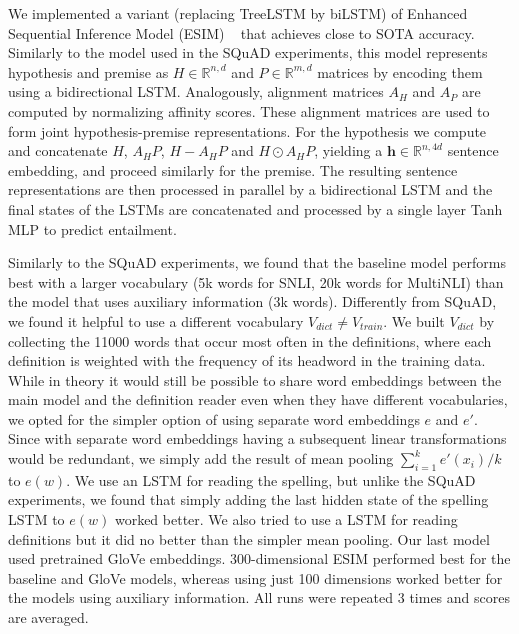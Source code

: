 We implemented a variant (replacing TreeLSTM by biLSTM) of Enhanced Sequential
Inference Model (ESIM) ~\citep{DBLP:journals/corr/ChenZLWJ16} that achieves close to SOTA accuracy. Similarly to the model used in the SQuAD experiments, this model represents hypothesis and premise as $H\in\mathbb{R}^{n,d}$ and $P\in\mathbb{R}^{m,d}$ matrices by encoding them using a bidirectional LSTM. Analogously, alignment matrices $A_H$ and $A_P$  are computed by normalizing affinity scores. These alignment matrices are used to form joint hypothesis-premise representations. 
For the hypothesis we compute and concatenate $H$, $A_H P$, $H - A_H P$ and $H \odot A_H P$, yielding a $\mathbf{h} \in \mathbb{R}^{n, 4d}$ sentence embedding, and proceed similarly for the premise. The resulting sentence representations are then processed in parallel by a bidirectional LSTM and the final states of the LSTMs are concatenated and processed by a single layer Tanh MLP to predict entailment.

Similarly to the SQuAD experiments, we found that the baseline model performs best with a larger vocabulary (5k words for SNLI, 20k words for MultiNLI) than the model that uses auxiliary information (3k words). Differently from SQuAD, we found it helpful to use a different vocabulary $V_{dict} \neq V_{train}$. We built $V_{dict}$ by collecting the 11000 words that occur most often in the definitions, where each definition is weighted with the frequency of its headword in the training data. While in theory it would still be possible to share word embeddings between the main model and the definition reader even when they have different vocabularies, we opted for the simpler option of using separate word embeddings $e$ and $e'$. Since with separate word embeddings having a subsequent linear transformations would be redundant, we simply add the result of mean pooling $\sum_{i=1}^k e'(x_i) / k$ to $e(w)$. We use an LSTM for reading the spelling, but unlike the SQuAD experiments, we found that simply adding the last hidden state of the spelling LSTM to $e(w)$ worked better. We also tried to use a LSTM for reading definitions but it did no better than the simpler mean pooling. Our last model used pretrained GloVe embeddings. 300-dimensional ESIM performed best for the baseline and GloVe models, whereas using just 100 dimensions worked better for the models using auxiliary information. 
All runs were repeated 3 times and scores are averaged. 


